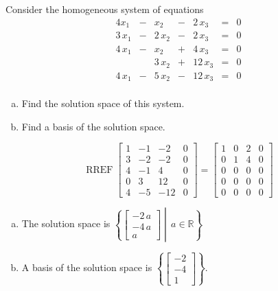 
\begin{exerciseStatement}


Consider the homogeneous system of equations 
\begin{alignat*}{4} x_{1} &-& x_{2} &-& 2 \, x_{3} &=& 0 \\3 \, x_{1} &-& 2 \, x_{2} &-& 2 \, x_{3} &=& 0 \\4 \, x_{1} &-& x_{2} &+& 4 \, x_{3} &=& 0 \\ & & 3 \, x_{2} &+& 12 \, x_{3} &=& 0 \\4 \, x_{1} &-& 5 \, x_{2} &-& 12 \, x_{3} &=& 0 \\ \end{alignat*}
            


\begin{enumerate}[(a)]
\item  Find the solution space of this system.
\item  Find a basis of the solution space.
\end{enumerate}
    
\end{exerciseStatement}
    
\begin{exerciseAnswer} 


\[\operatorname{RREF} \left[\begin{array}{ccc|c}
1 & -1 & -2 & 0 \\
3 & -2 & -2 & 0 \\
4 & -1 & 4 & 0 \\
0 & 3 & 12 & 0 \\
4 & -5 & -12 & 0
\end{array}\right] = \left[\begin{array}{ccc|c}
1 & 0 & 2 & 0 \\
0 & 1 & 4 & 0 \\
0 & 0 & 0 & 0 \\
0 & 0 & 0 & 0 \\
0 & 0 & 0 & 0
\end{array}\right] \]


\begin{enumerate}[(a)]
\item The solution space is \( \left\{ \left[\begin{array}{c}
-2 \, a \\
-4 \, a \\
a
\end{array}\right] \middle|\,a\in\mathbb{R}\right\} \)
\item A basis of the solution space is \( \left\{ \left[\begin{array}{c}
-2 \\
-4 \\
1
\end{array}\right] \right\} \).
\end{enumerate}
    
\end{exerciseAnswer}
    
